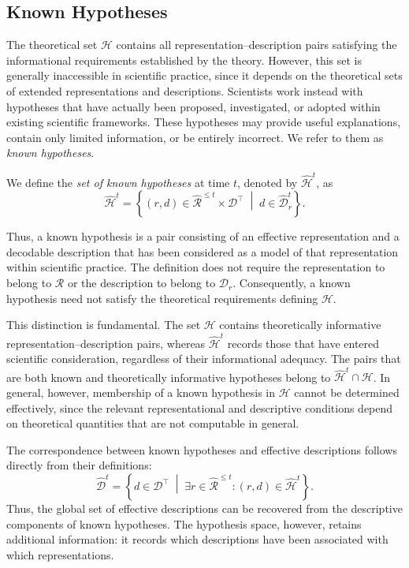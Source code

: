 
\subsection*{Known Hypotheses}
\label{subsec:known_hypotheses}

The theoretical set $\mathcal{H}$ contains all representation--description pairs satisfying the informational requirements established by the theory. However, this set is generally inaccessible in scientific practice, since it depends on the theoretical sets of extended representations and descriptions. Scientists work instead with hypotheses that have actually been proposed, investigated, or adopted within existing scientific frameworks. These hypotheses may provide useful explanations, contain only limited information, or be entirely incorrect. We refer to them as \emph{known hypotheses}.

\begin{definition}
\label{def:known_hypotheses}
We define the \emph{set of known hypotheses} at time $t$, denoted by $\hat{\mathcal{H}}^t$, as
\[
\hat{\mathcal{H}}^t = \left\{(r,d) \in \hat{\mathcal{R}}^{\leq t}\times\mathcal{D}^\top
\;\middle|\; d\in\hat{\mathcal{D}}_r^t \right\}.
\]
\end{definition}

Thus, a known hypothesis is a pair consisting of an effective representation and a decodable description that has been considered as a model of that representation within scientific practice. The definition does not require the representation to belong to $\mathcal{R}$ or the description to belong to $\mathcal{D}_r$. Consequently, a known hypothesis need not satisfy the theoretical requirements defining $\mathcal{H}$.

This distinction is fundamental. The set $\mathcal{H}$ contains theoretically informative representation--description pairs, whereas $\hat{\mathcal{H}}^t$ records those that have entered scientific consideration, regardless of their informational adequacy. The pairs that are both known and theoretically informative hypotheses belong to $\hat{\mathcal{H}}^t\cap\mathcal{H}$. In general, however, membership of a known hypothesis in $\mathcal{H}$ cannot be determined effectively, since the relevant representational and descriptive conditions depend on theoretical quantities that are not computable in general.

The correspondence between known hypotheses and effective descriptions follows directly from their definitions:
\[
\hat{\mathcal{D}}^t = \left\{ d\in\mathcal{D}^\top \;\middle|\;
\exists r\in\hat{\mathcal{R}}^{\leq t}: (r,d)\in\hat{\mathcal{H}}^t \right\}.
\]
Thus, the global set of effective descriptions can be recovered from the descriptive components of known hypotheses. The hypothesis space, however, retains additional information: it records which descriptions have been associated with which representations.

